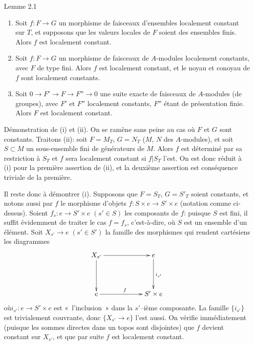 \documentclass[10pt]{../fichiers-configuration-latex/smfart}
\begin{document}
\begin{enonce*}{Lemme 2.1}
\begin{enumerate}
\renewcommand{\theenumi}{\roman{enumi}}
\renewcommand{\labelenumi}{(\theenumi)}
\item Soit $f:F\rightarrow G$ un morphisme de faisceaux d'ensembles
  localement constant sur $T$, et supposons que les valeurs locales de
  $F$ soient des ensembles finis. Alors $f$ est localement constant.

\item Soit $f:F\rightarrow G$ un morphisme de faisceaux de $A$-modules
  localement constants, avec $F$ de type fini. Alors $f$ est
  localement constant, et le noyau et conoyau de $f$ sont localement
  constants.

\item Soit $0\rightarrow F'\rightarrow F\rightarrow F''\rightarrow 0$
  une suite exacte de faisceaux de $A$-modules (\resp de groupes),
  avec $F'$ et $F''$ localement constants, $F''$ étant de présentation
  finie. Alors $F$ est localement constant.
\end{enumerate}
\end{enonce*}

Démonstration de (i) et (ii). On se ramène sans peine au cas où $F$ et
$G$ sont constants. Traitons (ii): soit $F=M_T$, $G=N_T$ ($M$, $N$ des
$A$-modules), et soit $S\subset M$ un sous-ensemble fini de
générateurs de $M$. Alors $f$ est déterminé par sa restriction à $S_T$
et $f$ sera localement constant si $f|S_T$ l'est. On est donc
réduit à (i) pour la première assertion de (ii), et la deuxième
assertion est conséquence triviale de la première.

Il reste donc à démontrer (i). Supposons que $F=S_T$, $G={S'}_T$
soient constants, et notons aussi par $f$ le morphisme d'objets
$f:S\times e\rightarrow S'\times e$ (notation comme ci-dessus). Soient
$f_s:e\rightarrow S'\times e$ $(s'\in S)$ les composants de $f$: puisque
$S$ est fini, il suffit évidemment de traiter le cas $f=f_s$,
c'est-à-dire, où $S$ est un ensemble d'un élément. Soit
$X_{s'}\rightarrow e$ $(s'\in S')$ la famille des morphismes qui rendent
cartésiens les diagrammes
$$
\xymatrix@C=2cm@R=1.5cm{
X_{s'} \ar[r] \ar[d]& e\ar[d]^{i_{s'}}\\
e   \ar[r]^{f}   & S'\times e
}
$$
où\pageoriginale $i_{s'}:e\rightarrow S'\times e$ est
« l'inclusion » dans la $s'$--ième composante. La famille $\{i_{s'}\}$ est
trivialement couvrante, donc $\{X_{s'}\rightarrow e\}$ l'est aussi. On
vérifie immédiatement (puisque les sommes directes dans un topos sont
disjointes) %
que $f$ devient constant sur $X_{s'}$, et que par suite $f$
est localement constant.
\end{document}
